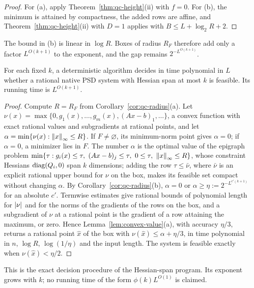 \begin{proof}
For (a), apply Theorem~\ref{thm:qc-height}(ii) with $f=0$. For (b), the
minimum is attained by compactness, the added rows are affine, and
Theorem~\ref{thm:qc-height}(ii) with $D=1$ applies with $B\le L+\log_2R+2$.
\end{proof}

The bound in (b) is linear in $\log R$. Boxes of radius $R_F$ therefore add
only a factor $L^{O(k+1)}$ to the exponent, and the gap remains
$2^{-L^{O(k+1)}}$.

\begin{proposition}
\label{prop:qc-decision}
For each fixed $k$, a deterministic algorithm decides in time polynomial in
$L$ whether a rational native PSD system with Hessian span at most $k$ is
feasible. Its running time is $L^{O(k+1)}$.
\end{proposition}

\begin{proof}
Compute $R=R_F$ from Corollary~\ref{cor:qc-radius}(a). Let
$\nu(x)=\max\{0,g_1(x),\ldots,g_m(x),(Ax-b)_1,\ldots\}$, a convex function
with exact rational values and subgradients at rational points, and let
$\alpha=\min\{\nu(x):\left\lVert x\right\rVert_\infty\le R\}$. If $F\ne\varnothing$, its
minimum-norm point gives $\alpha=0$; if $\alpha=0$, a minimizer lies in $F$.
The number $\alpha$ is the optimal value of the epigraph problem
$\min\{\tau:g_i(x)\le\tau,\ (Ax-b)_j\le\tau,\ 0\le\tau,\ \norm x_\infty\le R\}$,
whose constraint Hessians $\operatorname{diag}(Q_i,0)$ span $k$ dimensions; adding the row
$\tau\le\bar\nu$, where $\bar\nu$ is an explicit rational upper bound for
$\nu$ on the box, makes its feasible set compact without changing $\alpha$. By
Corollary~\ref{cor:qc-radius}(b), $\alpha=0$ or $\alpha\ge\eta:=
2^{-L^{c'(k+1)}}$ for an absolute $c'$. Termwise estimates give rational
bounds of polynomial length for $\left\lvert\nu\right\rvert$ and for the norms of the gradients
of the rows on the box, and a subgradient of $\nu$ at a rational point is the
gradient of a row attaining the maximum, or zero. Hence
Lemma~\ref{lem:convex-value}(a), with accuracy $\eta/3$, returns a rational
point $\hat x$ of the box with $\nu(\hat x)\le\alpha+\eta/3$, in time
polynomial in $n$, $\log R$, $\log(1/\eta)$ and the input length. The system
is feasible exactly when $\nu(\hat x)<\eta/2$.
\end{proof}

This is the exact decision procedure of the Hessian-span program. Its
exponent grows with $k$; no running time of the form $\phi(k)L^{O(1)}$ is
claimed.

